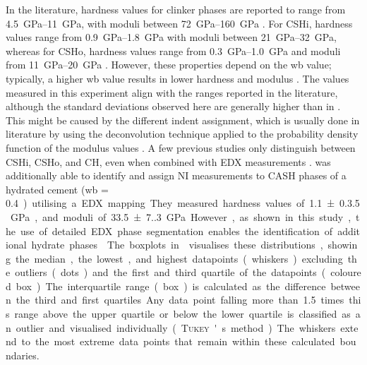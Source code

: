 In the literature, hardness values for clinker phases are reported to range from \qtyrange{4.5}{11}{\giga\pascal}, with moduli between \qtyrange{72}{160}{\giga\pascal} \cite{sebastiani.2016,han.2012,xu.2017, lahayne.2022}.
For \ac{CSHi}, hardness values range from \qtyrange{0.9}{1.8}{\giga\pascal} with moduli between \qtyrange{21}{32}{\giga\pascal}, whereas for \ac{CSHo}, hardness values range from \qtyrange{0.3}{1.0}{\giga\pascal} and moduli from \qtyrange{11}{20}{\giga\pascal} \cite{han.2012, xu.2017, lahayne.2022}.
However, these properties depend on the \ac{wb} value; typically, a higher \ac{wb} value results in lower hardness and modulus \cite{xu.2017}.
The values measured in this experiment align with the ranges reported in the literature, although the standard deviations observed here are generally higher than in \cite{sebastiani.2016,xu.2017}.
This might be caused by the different indent assignment, which is usually done in literature by using the deconvolution technique applied to the probability density function of the modulus values \cite{sebastiani.2016,xu.2017}.
A few previous studies only distinguish between \ac{CSHi}, \ac{CSHo}, and \ac{CH}, even when combined with \ac{EDX} measurements \cite{sebastiani.2016, lahayne.2022}.
\textcite{wilson.2018} was additionally able to identify and assign \ac{NI} measurements to \ac{CASH} phases of a hydrated cement (\ac{wb} = \qty{0.4}) utilising a \ac{EDX} mapping.
They measured hardness values of \qty{1.1(0.35)}{\giga\pascal}, and moduli of \qty{33.5(7.3)}{\giga\pascal}.
However, as shown in this study, the use of detailed \ac{EDX} phase segmentation enables the identification of additional hydrate phases.

The boxplots in  visualises these distributions, showing the median, the lowest, and highest datapoints (whiskers) excluding the outliers (dots) and the first and third quartile of the datapoints (coloured box).
The interquartile range (box) is calculated as the difference between the third and first quartiles.
Any data point falling more than \num{1.5} times this range above the upper quartile or below the lower quartile is classified as an outlier and visualised individually (\textsc{Tukey}'s method).
The whiskers extend to the most extreme data points that remain within these calculated boundaries.

